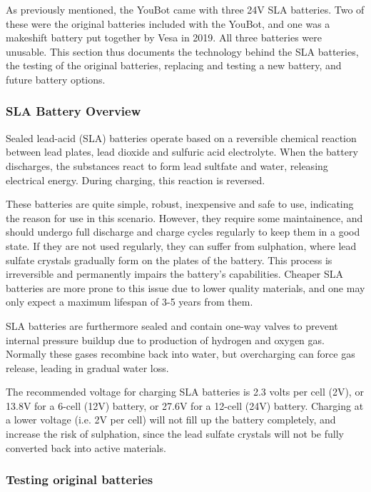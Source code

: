 \documentclass[a4paper, 12pt]{article}
\begin{document}
    As previously mentioned, the YouBot came with three 24V SLA batteries. Two of these were the original batteries included with the YouBot, and one was a makeshift battery put together by Vesa in 2019. All three batteries were unusable. This section thus documents the technology behind the SLA batteries, the testing of the original batteries, replacing and testing a new battery, and future battery options. 

    \subsubsection{SLA Battery Overview}

    Sealed lead-acid (SLA) batteries operate based on a reversible chemical reaction between lead plates, lead dioxide and sulfuric acid electrolyte. When the battery discharges, the substances react to form lead sultfate and water, releasing electrical energy. During charging, this reaction is reversed.

    These batteries are quite simple, robust, inexpensive and safe to use, indicating the reason for use in this scenario. However, they require some maintainence, and should undergo full discharge and charge cycles regularly to keep them in a good state. If they are not used regularly, they can suffer from sulphation, where lead sulfate crystals gradually form on the plates of the battery. This process is irreversible and permanently impairs the battery's capabilities. Cheaper SLA batteries are more prone to this issue due to lower quality materials, and one may only expect a maximum lifespan of 3-5 years from them. 

    SLA batteries are furthermore sealed and contain one-way valves to prevent internal pressure buildup due to production of hydrogen and oxygen gas. Normally these gases recombine back into water, but overcharging can force gas release, leading in gradual water loss. 

    The recommended voltage for charging SLA batteries is 2.3 volts per cell (2V), or 13.8V for a 6-cell (12V) battery, or 27.6V for a 12-cell (24V) battery. Charging at a lower voltage (i.e. 2V per cell) will not fill up the battery completely, and increase the risk of sulphation, since the lead sulfate crystals will not be fully converted back into active materials. 

    \subsubsection{Testing original batteries}
\end{document}
